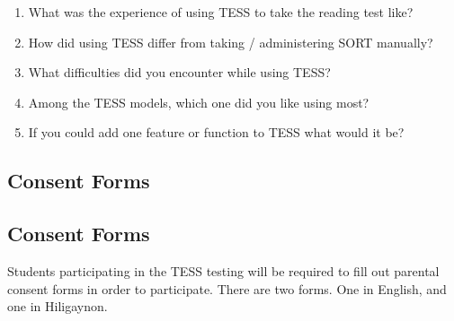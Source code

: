 \begin{enumerate}
\item What was the experience of using TESS to take the reading test like?
\item How did using TESS differ from taking / administering SORT manually?
\item What difficulties did you encounter while using TESS?
\item Among the TESS models, which one did you like using most?
\item If you could add one feature or function to TESS what would it be?
\end{enumerate}

\subsection{Consent Forms}
\subsection{Consent Forms}
Students participating in the TESS testing will be required to fill out parental consent forms in order to participate.
There are two forms. One in English, and one in Hiligaynon.
